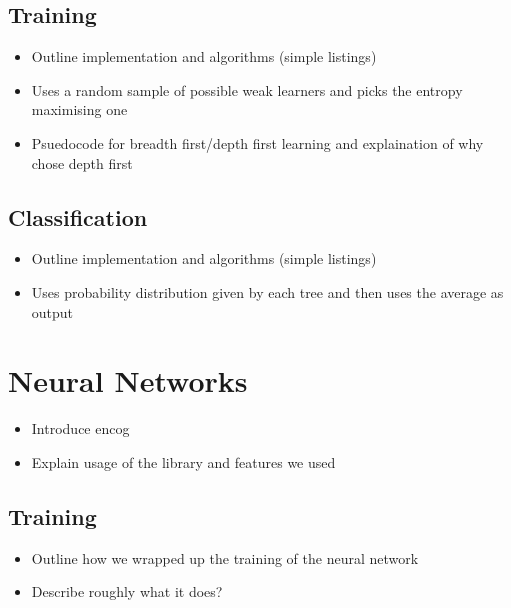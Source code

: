 \documentclass[12pt,twoside,notitlepage]{report}
\begin{document}



      \subsection{Training}
          \begin{framed}
              \begin{itemize}
                  \item Outline implementation and algorithms (simple listings)
                  \item Uses a random sample of possible weak learners and picks the entropy maximising one
                  \item Psuedocode for breadth first/depth first learning and explaination of why chose depth first
              \end{itemize}
          \end{framed}

      \subsection{Classification}
          \begin{framed}
              \begin{itemize}
                  \item Outline implementation and algorithms (simple listings)
                  \item Uses probability distribution given by each tree and then uses the average as output
              \end{itemize}
          \end{framed}

    \section{Neural Networks}
        \begin{framed}
            \begin{itemize}
                \item Introduce encog
                \item Explain usage of the library and features we used
            \end{itemize}
        \end{framed}

        \subsection{Training}
            \begin{framed}
                \begin{itemize}
                    \item Outline how we wrapped up the training of the neural network
                    \item Describe roughly what it does?
                \end{itemize}
            \end{framed}
\end{document}
